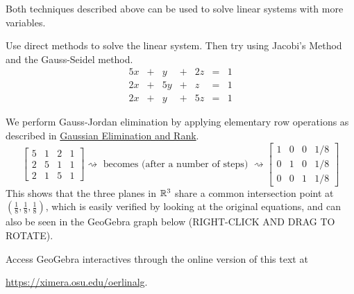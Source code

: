 \documentclass{ximera}
\begin{document}
Both techniques described above can be used to solve linear systems with more variables.

\begin{example}\label{ex:3x3iterative}
Use direct methods to solve the linear system.  Then try using Jacobi's Method and the Gauss-Seidel method.
$$\begin{array}{ccccccc}
      5x & +&y&+&2z&= &1 \\
	 2x& +&5y&+&z&=&1\\
     2x& +&y&+&5z&=&1
    \end{array}$$

\begin{explanation}
We perform Gauss-Jordan elimination by applying elementary row operations as described in \href{https://ximera.osu.edu/oerlinalg/LinearAlgebra/SYS-0030/main}{Gaussian Elimination and Rank}.  
\begin{equation*}
\left[\begin{array}{ccc|c}  5&1&2&1\\2&5&1&1\\2&1&5&1
 \end{array}\right]
 \rightsquigarrow\text{ becomes (after a number of steps) } \rightsquigarrow
\left[\begin{array}{ccc|c}  1&0&0&1/8\\0&1&0&1/8\\0&0&1&1/8
 \end{array}\right]
\end{equation*}
This shows that the three planes in $\mathbb{R}^3$ share a common intersection point at $\left(\frac{1}{8},\frac{1}{8},\frac{1}{8} \right)$, which is easily verified by looking at the original equations, and can also be seen in the GeoGebra graph below (RIGHT-CLICK AND DRAG TO ROTATE).

\begin{pdfOnly}
Access GeoGebra interactives through the online version of this text at 

\href{https://ximera.osu.edu/oerlinalg}{https://ximera.osu.edu/oerlinalg}.
\end{pdfOnly}

\begin{onlineOnly}
    \begin{center}
\end{center}
\end{onlineOnly}


\end{explanation}
\end{example}
\end{document}
